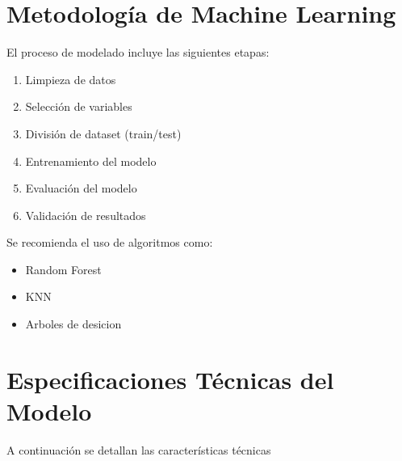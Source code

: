 \documentclass[12pt]{article}
\begin{document}
\section{Metodología de Machine Learning}

El proceso de modelado incluye las siguientes etapas:

\begin{enumerate}
    \item Limpieza de datos
    \item Selección de variables
    \item División de dataset (train/test)
    \item Entrenamiento del modelo
    \item Evaluación del modelo
    \item Validación de resultados
\end{enumerate}

Se recomienda el uso de algoritmos como:

\begin{itemize}
    \item Random Forest
    \item KNN
    \item Arboles de desicion
\end{itemize}

\section{Especificaciones Técnicas del Modelo}

A continuación se detallan las características técnicas
\end{document}
